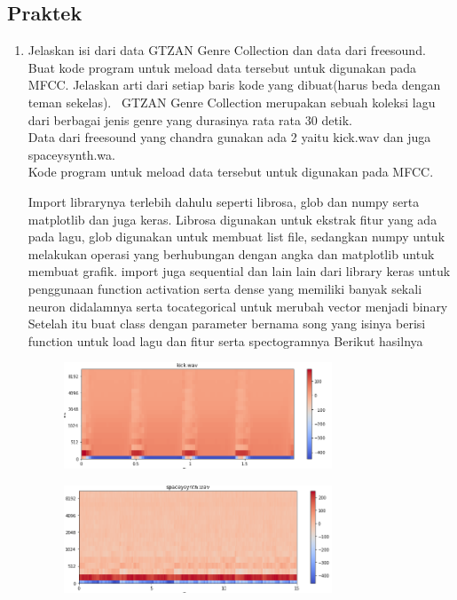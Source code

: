 \subsection{Praktek}
\begin{enumerate}
	\item Jelaskan isi dari data GTZAN Genre Collection dan data dari freesound. Buat kode program untuk meload data tersebut untuk digunakan pada MFCC. Jelaskan arti dari setiap baris kode yang dibuat(harus beda dengan teman sekelas).
	\hfill\break
	\ GTZAN Genre Collection merupakan sebuah koleksi lagu dari berbagai jenis genre yang durasinya rata rata 30 detik.\\
	Data dari freesound yang chandra gunakan ada 2 yaitu kick.wav dan juga spaceysynth.wa.\\
	Kode program untuk meload data tersebut untuk digunakan pada MFCC.
	
	\hfill\break
	Import librarynya terlebih dahulu seperti librosa, glob dan numpy serta matplotlib dan juga keras. Librosa digunakan untuk ekstrak fitur yang ada pada lagu, glob digunakan untuk membuat list file, sedangkan numpy untuk melakukan operasi yang berhubungan dengan angka dan matplotlib untuk membuat grafik. import juga sequential dan lain lain dari library keras untuk penggunaan function activation serta dense yang memiliki banyak sekali neuron didalamnya serta tocategorical untuk merubah vector menjadi binary
	\hfill\break
	Setelah itu buat class dengan parameter bernama song yang isinya berisi function untuk load lagu dan fitur serta spectogramnya
	\hfill\break
	Berikut hasilnya
	\hfill\break
	\begin{figure}[H]
		\includegraphics[width=8cm]{figures/1174071/6/1,1.PNG}
		\centering
	\end{figure}
	\hfill\break
	\begin{figure}[H]
		\includegraphics[width=8cm]{figures/1174071/6/1,2.PNG}

\end{figure}
\end{enumerate}
